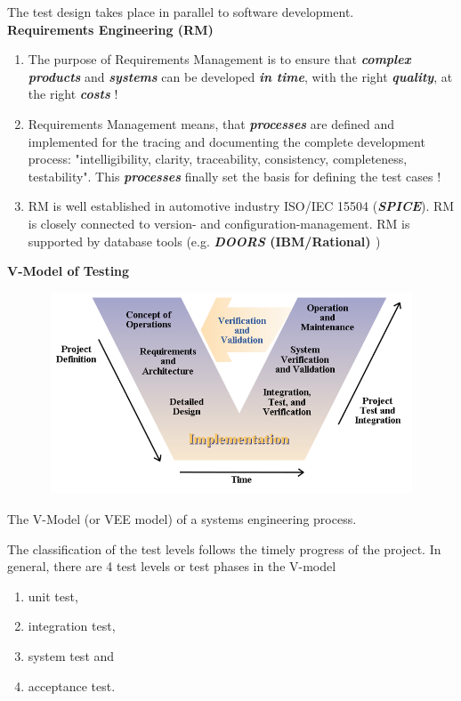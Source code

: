 The test design takes place in parallel to software development.\\

\textbf{ Requirements Engineering (RM)}

\begin{enumerate}
\item \textbf{ }The purpose of Requirements Management is to ensure that \textbf{\textit{complex products}} and \textbf{\textit{systems}} can be developed \textbf{\textit{in time}}, with the right \textbf{\textit{quality}}, at the right \textbf{\textit{costs}} !
\item  Requirements Management means, that \textbf{\textit{processes}} are defined and implemented for the tracing and documenting the complete development process: "intelligibility, clarity, traceability, consistency, completeness, testability". This \textbf{\textit{processes}} finally set the basis for defining the test cases !
\item  RM is well established in automotive industry  ISO/IEC 15504 (\textbf{\textit{SPICE}}). RM is closely connected to version- and configuration-management. RM is supported by database tools (e.g. \textbf{\textit{DOORS }(IBM/Rational)\textit{ }})
\end{enumerate}
\newpage

{\rot\bf V-Model of Testing}

    \begin{figure}[h]
    \centering
    \includegraphics[width=12cm, height=6cm]{Images/image58.png}
    \label{fig:Fig }
    \end{figure}

The V-Model (or VEE model) of a systems engineering process.

The classification of the test levels follows the timely progress of the project. In general, there are 4 test levels or test phases in the V-model   

\begin{enumerate}
\item  unit test,
\item  integration test, 
\item  system test and 
\item  acceptance test.
\end{enumerate}

